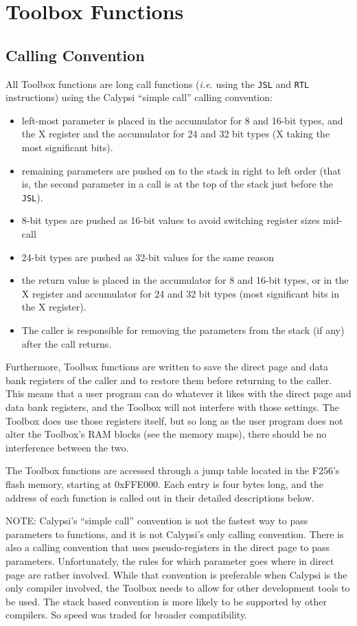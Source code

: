 \chapter{Toolbox Functions}

\section{Calling Convention}

All Toolbox functions are long call functions ({\it i.e.} using the \verb+JSL+ and \verb+RTL+ instructions) using the Calypsi ``simple call'' calling convention:
\begin{itemize}
	\item left-most parameter is placed in the accumulator for 8 and 16-bit types, and the X register and the accumulator for 24 and 32 bit types (X taking the most significant bits).
	\item remaining parameters are pushed on to the stack in right to left order (that is, the second parameter in a call is at the top of the stack just before the \verb+JSL+).
	\item 8-bit types are pushed as 16-bit values to avoid switching register sizes mid-call
	\item 24-bit types are pushed as 32-bit values for the same reason
	\item the return value is placed in the accumulator for 8 and 16-bit types, or in the X register and accumulator for 24 and 32 bit types (most significant bits in the X register).
	\item The caller is responsible for removing the parameters from the stack (if any) after the call returns.
\end{itemize}

Furthermore, Toolbox functions are written to save the direct page and data bank registers of the caller and to restore them before returning to the caller.
This means that a user program can do whatever it likes with the direct page and data bank registers,
and the Toolbox will not interfere with those settings. The Toolbox does use those registers itself,
but so long as the user program does not alter the Toolbox's RAM blocks (see the memory maps), there should be no interference between the two.

The Toolbox functions are accessed through a jump table located in the F256's flash memory, starting at 0xFFE000.
Each entry is four bytes long, and the address of each function is called out in their detailed descriptions below.

NOTE: Calypsi's ``simple call'' convention is not the fastest way to pass parameters to functions, and it is not Calypsi's only calling convention.
There is also a calling convention that uses pseudo-registers in the direct page to pass parameters.
Unfortunately, the rules for which parameter goes where in direct page are rather involved.
While that convention is preferable when Calypsi is the only compiler involved, the Toolbox needs to allow for other development tools to be used.
The stack based convention is more likely to be supported by other compilers. So speed was traded for broader compatibility.






